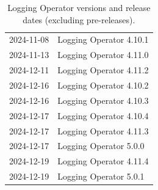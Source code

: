 \documentclass[../main.tex]{subfiles}
\begin{document}
\begin{table}[H]
\begin{tabular}{|c|l|}
        2024-11-08 & Logging Operator 4.10.1 \\
        2024-11-13 & Logging Operator 4.11.0 \\
        2024-12-11 & Logging Operator 4.11.2 \\
        2024-12-16 & Logging Operator 4.10.2 \\
        2024-12-16 & Logging Operator 4.10.3 \\
        2024-12-17 & Logging Operator 4.10.4 \\
        2024-12-17 & Logging Operator 4.11.3 \\
        2024-12-17 & Logging Operator 5.0.0 \\
        2024-12-19 & Logging Operator 4.11.4 \\
        2024-12-19 & Logging Operator 5.0.1 \\
        \hline
    \end{tabular}
   \caption{Logging Operator versions and release dates (excluding pre-releases). \protect\footnotemark}
   \label{tab:logging_operator_versions}
\end{table}

\end{document}
